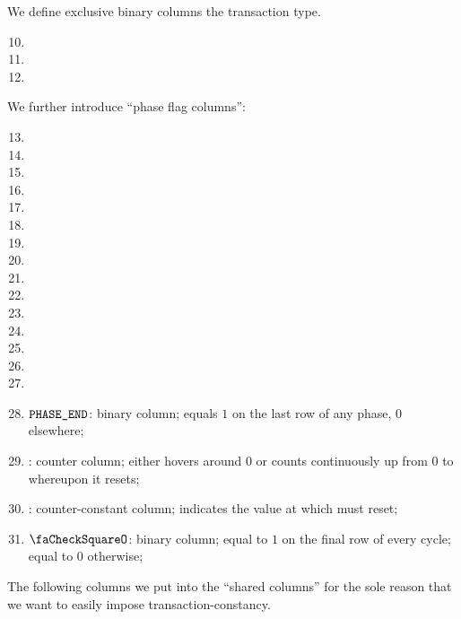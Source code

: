 We define exclusive binary columns the transaction type.
\begin{multicols}{3}
    \begin{enumerate}
	    \setcounter{enumi}{9}
	\item \typeZeroTx{}
	\item \typeOneTx{}
	\item \typeTwoTx{}
    \end{enumerate}
\end{multicols}
We further introduce ``phase flag columns'':
\begin{multicols}{3}
    \begin{enumerate}[resume]
	    \setcounter{enumi}{12}
	\item \phaseRlpPrefix{}
	\item \phaseChainId{}
	\item \phaseNonce{}
	\item \phaseGasPrice{}
	\item \phaseGasLimit{}
	\item \phaseTo{}
	\item \phaseValue{}
	\item \phaseData{}
	\item \phaseAccessList{}
	\item \phaseBeta{}
	\item \phaseMaxPriorityFeePerGas{}
	\item \phaseMaxFeePerGas{}
	\item \phaseY{}
	\item \phaseR{}
	\item \phaseS{}
    \end{enumerate}
\end{multicols}
\begin{enumerate}
	\setcounter{enumi}{27}
    \item $\texttt{PHASE\_END}$:
	binary column; equals $1$ on the last row of any phase, $0$ elsewhere;
    \item \ct{}:
	counter column; 
	either hovers around $0$ or counts continuously up from $0$ to \maxCt{} whereupon it resets;
    \item \maxCt:
	counter-constant column;
	indicates the value at which \ct{} must reset;
    \item $\done$:
	binary column; equal to $1$ on the final row of every \ct{} cycle; equal to $0$ otherwise;
\end{enumerate}
The following columns we put into the ``shared columns'' for the sole reason that we want to easily impose transaction-constancy.
